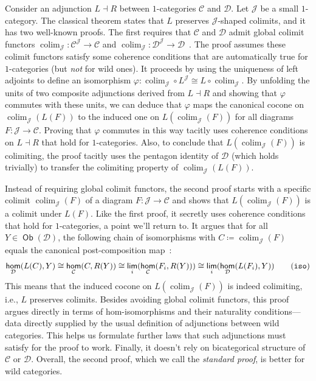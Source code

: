 \documentclass[10pt,a4paper]{article}
\theoremstyle{definition}
\theoremstyle{remark}
\newcommand{\C}{\mathcal C}
\newcommand{\D}{\mathcal D}
\newcommand{\J}{\mathcal{J}}
\newcommand{\0}{\mathbf{0}}
\newcommand{\1}{\mathbf{1}}
\newcommand{\2}{\mathbf{2}}
\DeclareMathOperator{\homm}{\mathsf{hom}}
\DeclareMathOperator{\limm}{\mathsf{lim}}
\DeclareMathOperator{\colim}{\mathrm{colim}}
\DeclareMathOperator{\obb}{\mathsf{Ob}}
\begin{document}
Consider an adjunction $L \dashv R$ between $1$-categories $\C$ and $\D$. Let $\J$ be a small $1$-category. The classical theorem states that $L$ preserves $\J$-shaped colimits, and it has two well-known proofs. The first requires that $\C$ and $\D$ admit global colimit functors $\colim_{\J} : \C^{\J} \to \C$ and $\colim_{\J} : \D^{\J} \to \D$~\cite[Section V.5]{CTWM}. The proof assumes these colimit functors satisfy some coherence conditions that are automatically true for $1$-categories (but \emph{not} for wild ones). It proceeds by using the uniqueness of left adjoints to define an isomorphism $\varphi : \colim_{\J} \circ L^{\J} \cong  L \circ \colim_{\J}$. By unfolding the units of two composite adjunctions derived from $L \dashv R$ and showing that $\varphi$ commutes with these units, we can deduce that $\varphi$ maps the canonical cocone on $\colim_{\J}(L(F))$ to the induced one on $L(\colim_{\J}(F))$ for all diagrams $F : \J \to \C$. Proving that $\varphi$ commutes in this way tacitly uses coherence conditions on $L \dashv R$ that hold for $1$-categories. Also, to conclude that $L(\colim_{\J}(F))$ is colimiting, the proof tacitly uses the pentagon identity of $\D$ (which holds trivially) to transfer the colimiting property of $\colim_{\J}(L(F))$.

Instead of requiring global colimit functors, the second proof starts with a specific colimit $\colim_{\J}(F)$ of a diagram $F : \J \to \C$ and shows that $L(\colim_{\J}(F))$ is a colimit under $L(F)$. Like the first proof, it secretly uses coherence conditions that hold for $1$-categories, a point we'll return to. It argues that for all $Y \in \obb(\D)$, the following chain of isomorphisms with $C \coloneqq \colim_{\J}(F)$ equals the canonical post-composition map~\cite[Theorem 4.5.2]{CTIC}:
\[ \label{eq:iso}
  \homm_{\D}(L(C), Y) \cong \homm_{\C}(C, R(Y)) \cong \limm_i(\homm_{\C}(F_i, R(Y))) \cong \limm_i(\homm_{\D}(L(F_i), Y))\tag{\texttt{iso}}
\]
This means that the induced cocone on $L(\colim_{\J}(F))$ is indeed colimiting, i.e., $L$ preserves colimits. Besides avoiding global colimit functors, this proof argues directly in terms of hom-isomorphisms and their naturality conditions---data directly supplied by the usual definition of adjunctions between wild categories. This helps us formulate further laws that such adjunctions must satisfy for the proof to work. Finally, it doesn't rely on bicategorical structure of $\C$ or $\D$. Overall, the second proof, which we call the \emph{standard proof}, is better for wild categories.
\end{document}
